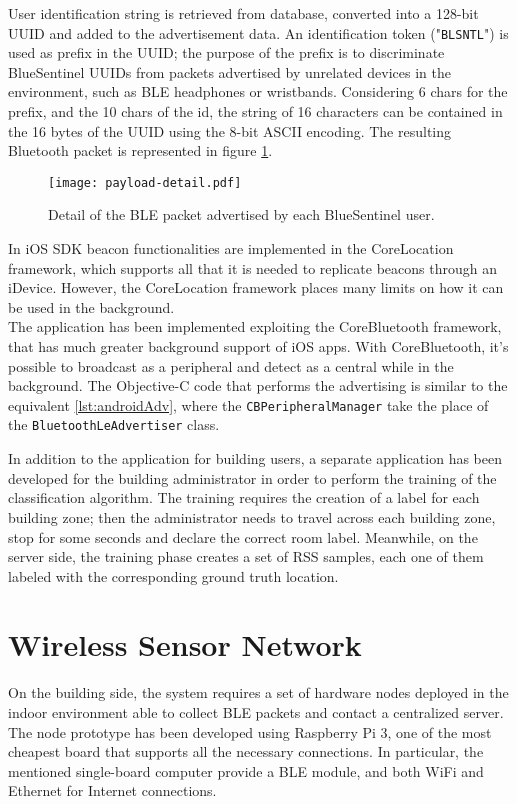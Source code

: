 User identification string is retrieved from database, converted into a 128-bit UUID and added to the advertisement data. An identification token ("\verb|BLSNTL|") is used as prefix in the UUID; the purpose of the prefix is to discriminate BlueSentinel UUIDs from packets advertised by unrelated devices in the environment, such as BLE headphones or wristbands. Considering 6 chars for the prefix, and the 10 chars of the id, the string of 16 characters can be contained in the 16 bytes of the UUID using the 8-bit ASCII encoding. The resulting Bluetooth packet is represented in figure \ref{fig:payload-detail}.

\begin{figure}[h!tb]
\centering
\texttt{[image: payload-detail.pdf]}
\caption[Detail of the BLE packet advertised by each BlueSentinel user.]{Detail of the BLE packet advertised by each BlueSentinel user.}
\label{fig:payload-detail}
\end{figure}

\medskip
In iOS SDK beacon functionalities are implemented in the CoreLocation framework, which supports all that it is needed to replicate beacons through an iDevice.
However, the CoreLocation framework places many limits on how it can be used in the background.\\
The application has been implemented exploiting the CoreBluetooth framework, that has much greater background support of iOS apps. With CoreBluetooth, it's possible to broadcast as a peripheral and detect as a central while in the background. The Objective-C code that performs the advertising is similar to the equivalent \ref{lst:androidAdv}, where the \verb|CBPeripheralManager| take the place of the \verb|BluetoothLeAdvertiser| class.


\medskip
In addition to the application for building users, a separate application has been developed for the building administrator in order to perform the training of the classification algorithm. The training requires the creation of a label for each building zone; then the administrator needs to travel across each building zone, stop for some seconds and declare the correct room label. Meanwhile, on the server side, the training phase creates a set of RSS samples, each one of them labeled with the corresponding ground truth location.

\section{Wireless Sensor Network}
\label{sec:wsn}
On the building side, the system requires a set of hardware nodes deployed in the indoor environment able to collect BLE packets and contact a centralized server. The node prototype has been developed using Raspberry Pi 3, one of the most cheapest board that supports all the necessary connections. In particular, the mentioned single-board computer provide a BLE module, and both WiFi and Ethernet for Internet connections.

